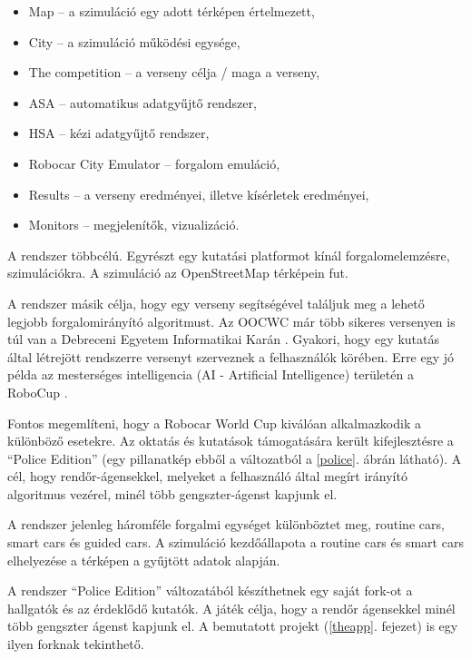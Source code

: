\documentclass[a4paper,12pt]{report}
\begin{document}
\begin{itemize}
\item Map -- a szimuláció egy adott térképen értelmezett,
\item City -- a szimuláció működési egysége,
\item The competition -- a verseny célja / maga a verseny,
\item ASA -- automatikus adatgyűjtő rendszer,
\item HSA -- kézi adatgyűjtő rendszer,
\item Robocar City Emulator -- forgalom emuláció,
\item Results -- a verseny eredményei, illetve kísérletek eredményei,
\item Monitors -- megjelenítők, vizualizáció.
\end{itemize}

A rendszer többcélú. Egyrészt egy kutatási platformot kínál forgalomelemzésre, szimulációkra. A szimuláció az OpenStreetMap \cite{osm} térképein fut. 

\vspace{2mm}
A rendszer másik célja, hogy egy verseny segítségével találjuk meg a lehető legjobb forgalomirányító algoritmust. Az OOCWC már több sikeres versenyen is túl van a Debreceni Egyetem Informatikai Karán \cite{competitions}. Gyakori, hogy egy kutatás által létrejött rendszerre versenyt szerveznek a felhasználók körében. Erre egy jó példa az mesterséges intelligencia (AI - Artificial Intelligence) területén a RoboCup \cite{robocup}.

\vspace{2mm}
Fontos megemlíteni, hogy a Robocar World Cup kiválóan alkalmazkodik a különböző esetekre. Az oktatás és kutatások támogatására került kifejlesztésre a ``Police Edition'' (egy pillanatkép ebből a változatból a \ref{police}. ábrán látható). A cél, hogy rendőr-ágensekkel, melyeket a felhasználó által megírt irányító algoritmus vezérel, minél több gengszter-ágenst kapjunk el.

\vspace{2mm}
A rendszer jelenleg háromféle forgalmi egységet különböztet meg, routine cars, smart cars és guided cars. A szimuláció kezdőállapota a routine cars és smart cars elhelyezése a térképen a gyűjtött adatok alapján.

\vspace{2mm}
A rendszer ``Police Edition'' változatából készíthetnek egy saját fork-ot a hallgatók és az érdeklődő kutatók. A játék célja, hogy a rendőr ágensekkel minél több gengszter ágenst kapjunk el. A bemutatott projekt (\ref{theapp}. fejezet) is egy ilyen forknak tekinthető.
\end{document}
